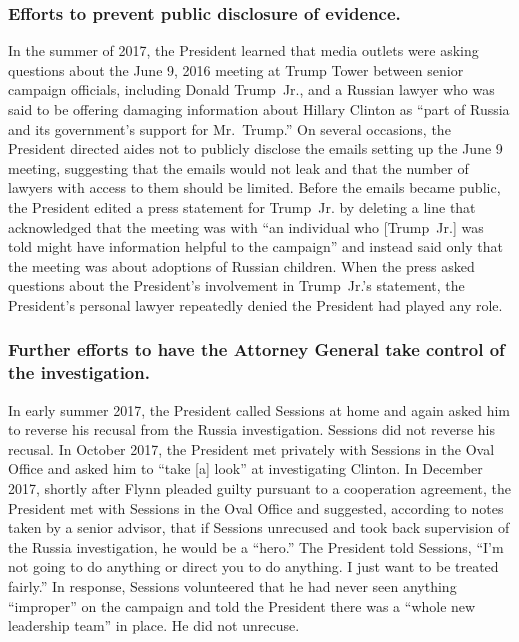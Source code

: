 \subsubsection*{Efforts to prevent public disclosure of evidence.}

In the summer of 2017, the President learned that media outlets were asking questions about the June 9, 2016 meeting at Trump Tower between senior campaign officials, including Donald Trump~Jr., and a Russian lawyer who was said to be offering damaging information about Hillary Clinton as “part of Russia and its government’s support for Mr.~Trump.”
On several occasions, the President directed aides not to publicly disclose the emails setting up the June 9 meeting, suggesting that the emails would not leak and that the number of lawyers with access to them should be limited.
Before the emails became public, the President edited a press statement for Trump~Jr. by deleting a line that acknowledged that the meeting was with “an individual who [Trump~Jr.] was told might have information helpful to the campaign” and instead said only that the meeting was about adoptions of Russian children.
When the press asked questions about the President’s involvement in Trump~Jr.’s statement, the President’s personal lawyer repeatedly denied the President had played any role.

\subsubsection*{Further efforts to have the Attorney General take control of the investigation.}

In early summer 2017, the President called Sessions at home and again asked him to reverse his recusal from the Russia investigation. Sessions did not reverse his recusal.
In October 2017, the President met privately with Sessions in the Oval Office and asked him to “take [a] look” at investigating Clinton.
In December 2017, shortly after Flynn pleaded guilty pursuant to a cooperation agreement, the President met with Sessions in the Oval Office and suggested, according to notes taken by a senior advisor, that if Sessions unrecused and took back supervision of the Russia investigation, he would be a “hero.”
The President told Sessions, “I’m not going to do anything or direct you to do anything.
I just want to be treated fairly.”
In response, Sessions volunteered that he had never seen anything “improper” on the campaign and told the President there was a “whole new leadership team” in place.
He did not unrecuse.

